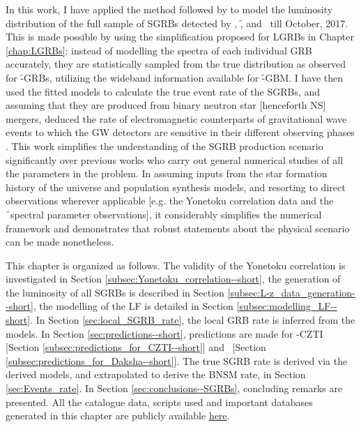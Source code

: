 In this work, I have applied the method followed by  to model the luminosity distribution of the full sample of SGRBs detected by \B, \f, and \s\ till October, 2017. This is made possible by using the simplification proposed for LGRBs in Chapter \ref{chap:LGRBs}: instead of modelling the spectra of each individual GRB accurately, they are statistically sampled from the true distribution as observed for \f -GRBs, utilizing the wideband information available for \f -GBM. I have then used the fitted models to calculate the true event rate of the SGRBs, and assuming that they are produced from binary neutron star [henceforth NS] mergers, deduced the rate of electromagnetic counterparts of gravitational wave events to which the GW detectors are sensitive in their different observing phases \citep{Abbott_et_al.-2016-review}. This work simplifies the understanding of the SGRB production scenario significantly over previous works who carry out general numerical studies of all the parameters in the problem. In assuming inputs from the star formation history of the universe and population synthesis models, and  resorting to direct observations wherever applicable [e.g. the Yonetoku correlation data and the \f\ spectral parameter observations], it considerably simplifies the numerical framework and demonstrates that robust statements about the physical scenario can be made nonetheless.

This chapter is organized as follows. The validity of the Yonetoku correlation is investigated in Section \ref{subsec:Yonetoku_correlation--short}, the generation of the luminosity of all SGRBs is described in Section \ref{subsec:L-z_data_generation--short}, the modelling of the LF is detailed in Section \ref{subsec:modelling_LF--short}. In Section \ref{sec:local_SGRB_rate}, the local GRB rate is inferred from the models. In Section \ref{sec:predictions--short}, predictions are made for \AS -CZTI [Section \ref{subsec:predictions_for_CZTI--short}] and \D\ [Section \ref{subsec:predictions_for_Daksha--short}]. The true SGRB rate is derived via the derived models, and extrapolated to derive the BNSM rate, in Section \ref{sec:Events_rate}. In Section \ref{sec:conclusions--SGRBs}, concluding remarks are presented. All the catalogue data, scripts used and important databases generated in this chapter are publicly available \href{https://github.com/DebduttaPaul/luminosity_function_of_SGRBs}{here}.



